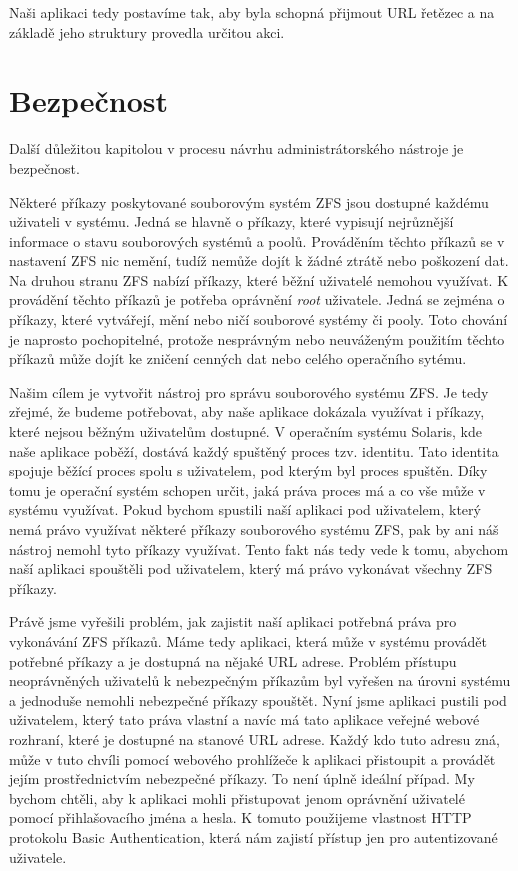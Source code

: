 Naši aplikaci tedy postavíme tak, aby byla schopná přijmout URL řetězec a na základě jeho struktury provedla určitou akci.
\section{Bezpečnost}
Další důležitou kapitolou v procesu návrhu administrátorského nástroje je bezpečnost.

Některé příkazy poskytované souborovým systém ZFS jsou dostupné každému uživateli v systému. Jedná se hlavně o příkazy, které vypisují nejrůznější informace o stavu souborových systémů a poolů. Prováděním těchto příkazů se v nastavení ZFS nic nemění, tudíž nemůže dojít k žádné ztrátě nebo poškození dat. Na druhou stranu ZFS nabízí příkazy, které běžní uživatelé nemohou využívat. K provádění těchto příkazů je potřeba oprávnění \emph{root} uživatele. Jedná se zejména o příkazy, které vytvářejí, mění nebo ničí souborové systémy či pooly. Toto chování je naprosto pochopitelné, protože nesprávným nebo neuváženým použitím těchto příkazů může dojít ke zničení cenných dat nebo celého operačního sytému.

Našim cílem je vytvořit nástroj pro správu souborového systému ZFS. Je tedy zřejmé, že budeme potřebovat, aby naše aplikace dokázala využívat i příkazy, které nejsou běžným uživatelům dostupné. V operačním systému Solaris, kde naše aplikace poběží, dostává každý spuštěný proces tzv. identitu. Tato identita spojuje běžící proces spolu s uživatelem, pod kterým byl proces spuštěn. Díky tomu je operační systém schopen určit, jaká práva proces má a co vše může v systému využívat. Pokud bychom spustili naší aplikaci pod uživatelem, který nemá právo využívat některé příkazy souborového systému ZFS, pak by ani náš nástroj nemohl tyto příkazy využívat. Tento fakt nás tedy vede k tomu, abychom naší aplikaci spouštěli pod uživatelem, který má právo vykonávat všechny ZFS příkazy.

Právě jsme vyřešili problém, jak zajistit naší aplikaci potřebná práva pro vykonávání ZFS příkazů. Máme tedy aplikaci, která může v systému provádět potřebné příkazy a je dostupná na nějaké URL adrese. Problém přístupu neoprávněných uživatelů k nebezpečným příkazům byl vyřešen na úrovni systému a jednoduše nemohli nebezpečné příkazy spouštět. Nyní jsme aplikaci pustili pod uživatelem, který tato práva vlastní a navíc má tato aplikace veřejné webové rozhraní, které je dostupné na stanové URL adrese. Každý kdo tuto adresu zná, může v tuto chvíli pomocí webového prohlížeče k aplikaci přistoupit a provádět jejím prostřednictvím nebezpečné příkazy. To není úplně ideální případ. My bychom chtěli, aby k aplikaci mohli přistupovat jenom oprávnění uživatelé pomocí přihlašovacího jména a hesla. K tomuto použijeme vlastnost HTTP protokolu Basic Authentication, která nám zajistí přístup jen pro autentizované uživatele.

